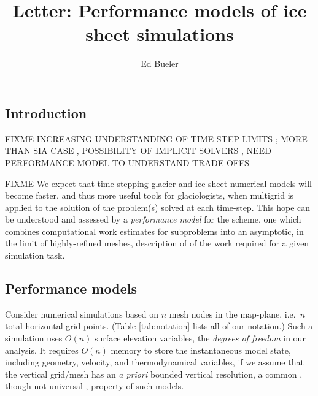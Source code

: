 \documentclass[twocolumn,letterpaper]{igs}
\begin{document}
\title[Performance models of ice sheet simulations]{Letter: Performance models of ice sheet simulations}


\author{Ed Bueler}



\maketitle

\sectionsize

\subsection{Introduction}

FIXME INCREASING UNDERSTANDING OF TIME STEP LIMITS \citep{Chengetal2017,Robinsonetal2022}; MORE THAN SIA CASE \citep[for comparison]{HindmarshPayne1996}, POSSIBILITY OF IMPLICIT SOLVERS \citep{Bueler2016,WirbelJarosch2020}, NEED PERFORMANCE MODEL TO UNDERSTAND TRADE-OFFS

FIXME We expect that time-stepping glacier and ice-sheet numerical models will become faster, and thus more useful tools for glaciologists, when multigrid is applied to the solution of the problem(s) solved at each time-step.  This hope can be understood and assessed by a \emph{performance model} for the scheme, one which combines computational work estimates for subproblems into an asymptotic, in the limit of highly-refined meshes, description of of the work required for a given simulation task.

\subsection{Performance models}

Consider numerical simulations based on $n$ mesh nodes in the map-plane, i.e.~$n$ total horizontal grid points.  (Table \ref{tab:notation} lists all of our notation.)  Such a simulation uses $O(n)$ surface elevation variables, the \emph{degrees of freedom} in our analysis.  It requires $O(n)$ memory to store the instantaneous model state, including geometry, velocity, and thermodynamical variables, if we assume that the vertical grid/mesh has an \emph{a priori} bounded vertical resolution, a common \citep[for example]{Brinkerhoffetal2017,Hoffmanetal2018}, though not universal \citep{IsaacStadlerGhattas2015}, property of such models.
\end{document}
